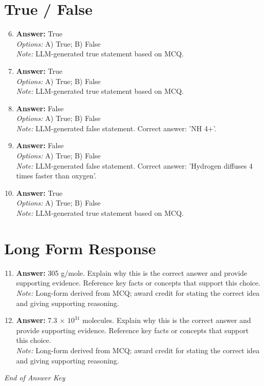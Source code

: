 \documentclass[12pt]{article}
\begin{document}
\section*{True / False}
\begin{enumerate}[label=\arabic*.]
\setcounter{enumi}{5}
\item \textbf{Answer:} True
\\ \textit{Options:} A) True; B) False
\\ \textit{Note:} LLM-generated true statement based on MCQ.
\item \textbf{Answer:} True
\\ \textit{Options:} A) True; B) False
\\ \textit{Note:} LLM-generated true statement based on MCQ.
\item \textbf{Answer:} False
\\ \textit{Options:} A) True; B) False
\\ \textit{Note:} LLM-generated false statement. Correct answer: 'NH 4+'.
\item \textbf{Answer:} False
\\ \textit{Options:} A) True; B) False
\\ \textit{Note:} LLM-generated false statement. Correct answer: 'Hydrogen diffuses 4 times faster than oxygen'.
\item \textbf{Answer:} True
\\ \textit{Options:} A) True; B) False
\\ \textit{Note:} LLM-generated true statement based on MCQ.
\end{enumerate}

\section*{Long Form Response}
\begin{enumerate}[label=\arabic*.]
\setcounter{enumi}{10}
\item \textbf{Answer:} 305 g/mole. Explain why this is the correct answer and provide supporting evidence. Reference key facts or concepts that support this choice.
\\ \textit{Note:} Long-form derived from MCQ; award credit for stating the correct idea and giving supporting reasoning.
\item \textbf{Answer:} 7.3 \ensuremath{\times} $10^31$ molecules. Explain why this is the correct answer and provide supporting evidence. Reference key facts or concepts that support this choice.
\\ \textit{Note:} Long-form derived from MCQ; award credit for stating the correct idea and giving supporting reasoning.
\end{enumerate}

\vfill
\noindent\textit{End of Answer Key}
\end{document}
